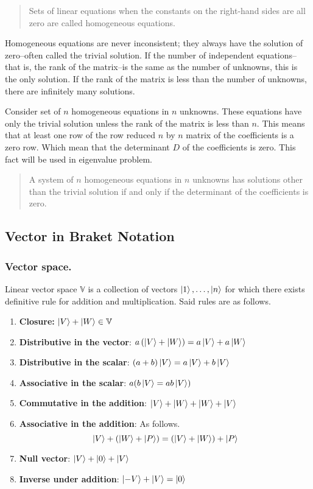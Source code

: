 \documentclass[../main.tex]{subfiles}
\begin{document}
\begin{quote}
	Sets of linear equations when the constants on the right-hand sides are all zero are called homogeneous equations.
\end{quote}

Homogeneous equations are never inconsistent; they always have the solution of zero--often called the trivial solution.
If the number of independent equations--that is, the rank of the matrix--is the same as the number of unknowns, this is the only solution.
If the rank of the matrix is less than the number of unknowns, there are infinitely many solutions.

Consider set of $n$ homogeneous equations in $n$ unknowns.
These equations have only the trivial solution unless the rank of the matrix is less than $n$.
This means that at least one row of the row reduced $n$ by $n$ matrix of the coefficients is a zero row.
Which mean that the determinant $D$ of the coefficients is zero.
This fact will be used in eigenvalue problem.

\begin{quote}
	A system of $n$ homogeneous equations in $n$ unknowns has solutions other than the trivial solution if and only if the determinant of the coefficients is zero.
\end{quote}

\subsection{Vector in Braket Notation}
\subsubsection{Vector space.}
Linear vector space $\mathbb{V}$ is a collection of vectors $\ket{1},\dots,\ket{n}$ for which there exists definitive rule for addition and multiplication.
Said rules are as follows.
\begin{enumerate}
	\item \textbf{Closure:} $\ket{V}+\ket{W}\in \mathbb{V}$
	\item \textbf{Distributive in the vector}: $a\left(\ket{V}+\ket{W}\right)=a\ket{V}+a \ket{W}$
	\item \textbf{Distributive in the scalar}: $(a+b)\ket{V}=a \ket{V}+b \ket{V}$
	\item \textbf{Associative in the scalar}: $a(b\ket{V}=ab\ket{V})$
	\item \textbf{Commutative in the addition}: $\ket{V}+\ket{W}+\ket{W}+\ket{V}$
	\item \textbf{Associative in the addition}: As follows.
	      \begin{equation*}
		      \ket{V}+\left(\ket{W}+\ket{P}\right)=\left(\ket{V}+\ket{W}\right)+\ket{P}
	      \end{equation*}
	\item \textbf{Null vector}: $\ket{V}+\ket{0}+\ket{V}$
	\item \textbf{Inverse under addition}: $\ket{-V}+\ket{V}=\ket{0}$
\end{enumerate}
\end{document}
